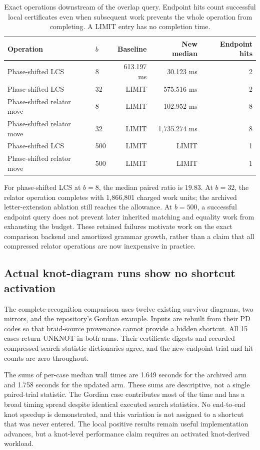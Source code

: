 \begin{table}[htbp]
\centering\small
\begin{tabular}{@{}llrrr@{}}
\toprule
Operation & $b$ & Baseline & New median & Endpoint hits\\
\midrule
Phase-shifted LCS & 8 & 613.197 ms & 30.123 ms & 2\\
Phase-shifted LCS & 32 & LIMIT & 575.516 ms & 2\\
Phase-shifted relator move & 8 & LIMIT & 102.952 ms & 8\\
Phase-shifted relator move & 32 & LIMIT & 1,735.274 ms & 8\\
Phase-shifted LCS & 500 & LIMIT & LIMIT & 1\\
Phase-shifted relator move & 500 & LIMIT & LIMIT & 1\\
\bottomrule
\end{tabular}
\caption{Exact operations downstream of the overlap query. Endpoint hits
count successful local certificates even when subsequent work prevents the
whole operation from completing. A LIMIT entry has no completion time.}
\label{tab:operations}
\end{table}

For phase-shifted LCS at $b=8$, the median paired ratio is $19.83$.
At $b=32$, the relator operation completes with 1,866,801 charged work
units; the archived letter-extension ablation still reaches the allowance.
At $b=500$, a successful endpoint query does not prevent later inherited
matching and equality work from exhausting the budget. These retained
failures motivate work on the exact comparison backend and amortized grammar
growth, rather than a claim that all compressed relator operations are now
inexpensive in practice.

\subsection{Actual knot-diagram runs show no shortcut activation}

The complete-recognition comparison uses twelve existing survivor diagrams,
two mirrors, and the repository's Gordian example. Inputs are rebuilt from
their PD codes so that braid-source provenance cannot provide a hidden
shortcut. All 15 cases return UNKNOT in both arms. Their certificate digests
and recorded compressed-search statistic dictionaries agree, and the new
endpoint trial and hit counts are zero throughout.

The sums of per-case median wall times are 1.649 seconds for the archived
arm and 1.758 seconds for the updated arm. These sums are descriptive, not
a single paired-trial statistic. The Gordian case contributes most of the
time and has a broad timing spread despite identical executed search
statistics. No end-to-end knot speedup is demonstrated, and this variation
is not assigned to a shortcut that was never entered. The local positive
results remain useful implementation advances, but a knot-level performance
claim requires an activated knot-derived workload.

